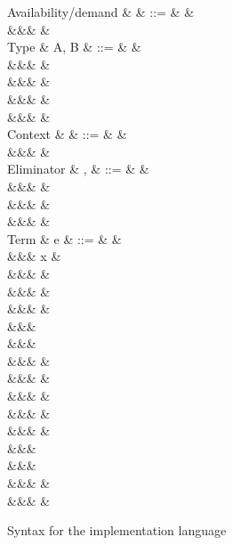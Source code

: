 \begin{figure}
\begin{syntaxfig}
\mbox{Availability/demand}
&
\alpha
&
::=
&
\top
&
\\
&&&
\bot
&
\\[2mm]
\mbox{Type}
&
A, B
&
::=
&
\tyBool
&
\\
&&&
\tyInt
&
\\
&&&
\tyList
&
\\
&&&
&
\\
&&&
&
\\[2mm]
\mbox{Context}
&
\Gamma
&
::=
&
\cxtEmpty
&
\\
&&&
&
\\[2mm]
\mbox{Eliminator}
&
\sigma, \tau
&
::=
&
&
\\
&&&
&
\\
&&&
&
\\
&&&
&
\\[2mm]
\mbox{Term}
&
e
&
::=
&
\bot
&
\\
&&&
x
&
\\
&&&
\exTrue \mid \exFalse
&
\\
&&&
&
\\
&&&
&
\\
&&&
\\
&&&
\\
&&&
&
\\
&&&
&
\\
&&&
&
\\
&&&
\exNil
&
\\
&&&
&
\\
&&&
\\
&&&
\\
&&&
&
\\
&&&
&
\end{syntaxfig}
\caption{Syntax for the implementation language}
\label{fig:impl-language:syntax}
\end{figure}
